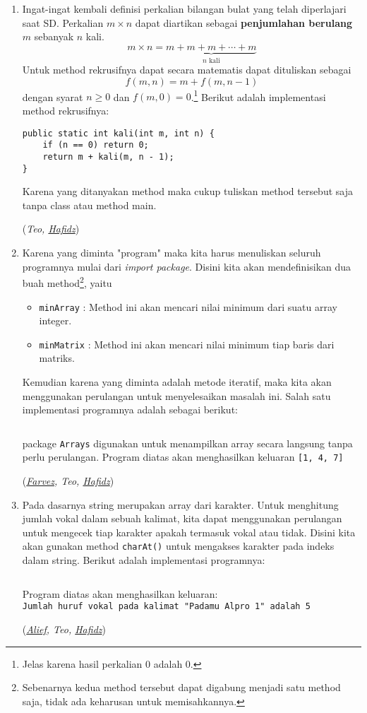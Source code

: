 \documentclass[10pt,openany,letterpaper]{article}
\newcommand{\solvedby}[1]{\begin{flushright} (\textit{#1}) \end{flushright}}
\newcommand{\hafidz}{\href{https://onlinegdb.com/m6lqnJb_O}{Hafidz}}
\newcommand{\farvez}{\href{https://onlinegdb.com/HH0MrKZ2R}{Farvez}}
\newcommand{\alief}{\href{https://onlinegdb.com/4ddQhXOTm}{Alief}}
\begin{document}
\begin{enumerate}
    \item Ingat-ingat kembali definisi perkalian bilangan bulat yang telah diperlajari saat SD. Perkalian $m\times n$ dapat diartikan sebagai \textbf{penjumlahan berulang} $m$ sebanyak $n$ kali.
    \[m\times n = \underbrace{m + m + m + \cdots + m}_{n \text{ kali}}\]
    Untuk method rekrusifnya dapat secara matematis dapat dituliskan sebagai
    \[f(m,n) = m + f(m,n-1)\] 
    dengan syarat $n \geq 0$ dan $f(m,0) = 0$.\footnote{Jelas karena hasil perkalian 0 adalah 0.} Berikut adalah implementasi method rekrusifnya:
    \begin{verbatim}
public static int kali(int m, int n) {
    if (n == 0) return 0;
    return m + kali(m, n - 1);
}
    \end{verbatim}
    Karena yang ditanyakan method maka cukup tuliskan method tersebut saja tanpa class atau method main.
    \solvedby{Teo, \hafidz}

    \item Karena yang diminta "program" maka kita harus menuliskan seluruh programnya mulai dari \textit{import package}. Disini kita akan mendefinisikan dua buah method\footnote{Sebenarnya kedua method tersebut dapat digabung menjadi satu method saja, tidak ada keharusan untuk memisahkannya.}, yaitu
    \begin{itemize}
        \item \texttt{minArray} : Method ini akan mencari nilai minimum dari suatu array integer.
        \item \texttt{minMatrix} : Method ini akan mencari nilai minimum tiap baris dari matriks.
    \end{itemize}
    Kemudian karena yang diminta adalah metode iteratif, maka kita akan menggunakan perulangan untuk menyelesaikan masalah ini. Salah satu implementasi programnya adalah sebagai berikut:
    \inputminted[frame=lines,framesep=2mm,baselinestretch=1.2,bgcolor=bg,fontsize=\footnotesize,linenos]{java}{No2.java}
    package \texttt{Arrays} digunakan untuk menampilkan array secara langsung tanpa perlu perulangan. Program diatas akan menghasilkan keluaran \texttt{[1, 4, 7]}
    \solvedby{\farvez, Teo, \hafidz}

    \item Pada dasarnya string merupakan array dari karakter. Untuk menghitung jumlah vokal dalam sebuah kalimat, kita dapat menggunakan perulangan untuk mengecek tiap karakter apakah termasuk vokal atau tidak. Disini kita akan gunakan method \texttt{charAt()} untuk mengakses karakter pada indeks dalam string. Berikut adalah implementasi programnya: 
    \inputminted[frame=lines,framesep=2mm,baselinestretch=1.2,bgcolor=bg,fontsize=\footnotesize,linenos]{java}{No3.java}
    Program diatas akan menghasilkan keluaran:\\
    \texttt{Jumlah huruf vokal pada kalimat "Padamu Alpro 1" adalah 5}
    \solvedby{\alief, Teo, \hafidz}


\end{enumerate}
\end{document}
